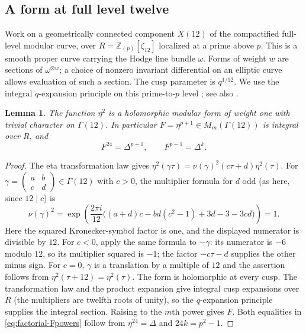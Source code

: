 \documentclass[11pt,a4paper]{article}
\numberwithin{equation}{section}
\newtheorem{lemma}[theorem]{Lemma}
\theoremstyle{definition}
\theoremstyle{remark}
\newcommand{\Z}{\mathbb Z}
\begin{document}
\subsection{A form at full level twelve}
Work on a geometrically connected component $X(12)$ of the compactified
full-level modular curve, over $R=\Z_{(p)}[\zeta_{12}]$ localized at a
prime above $p$. This is a smooth proper curve carrying the Hodge line
bundle $\omega$. Forms of weight $w$ are sections of $\omega^{\otimes w}$;
a choice of nonzero invariant differential on an elliptic curve allows
evaluation of such a section. The cusp parameter is $q^{1/12}$.
We use the integral $q$-expansion principle on this prime-to-$p$ level
\citep[\S1.6]{Katz73}; see also \citealp{DR73}.

\begin{lemma}\label{lem:eta-level12}
The function $\eta^2$ is a holomorphic modular form of weight one with
trivial character on $\Gamma(12)$. In particular
$F=\eta^{p+1}\in M_m(\Gamma(12))$ is integral over $R$, and
\begin{equation}\label{eq:factorial-Fpowers}
F^{24}=\Delta^{p+1},\qquad F^{p-1}=\Delta^k.
\end{equation}
\end{lemma}
\begin{proof}
The eta transformation law \citep[Ch.~4]{Knopp70} gives
$\eta^2(\gamma\tau)=\nu(\gamma)^2(c\tau+d)\eta^2(\tau)$.
For $\gamma=\begin{pmatrix}a&b\\c&d\end{pmatrix}\in\Gamma(12)$ with
$c>0$, the multiplier formula for $d$ odd (as here, since $12\mid c$) is
\[
\nu(\gamma)^2=
\exp\!\left(\frac{2\pi i}{12}
\bigl((a+d)c-bd(c^2-1)+3d-3-3cd\bigr)\right)=1.
\]
Here the squared Kronecker-symbol factor is one, and the displayed
numerator is divisible by $12$. For $c<0$, apply the same formula to
$-\gamma$: its numerator is $-6$ modulo $12$, so its multiplier squared
is $-1$; the factor $-c\tau-d$ supplies the other minus sign.
For $c=0$, $\gamma$ is a translation by a multiple of $12$ and the
assertion follows from $\eta^2(\tau+12)=\eta^2(\tau)$.
The form is holomorphic at every cusp. The transformation law and the
product expansion give integral cusp expansions over $R$ (the multipliers
are twelfth roots of unity), so the $q$-expansion principle supplies the
integral section. Raising to the $m$th power gives $F$.
Both equalities in \eqref{eq:factorial-Fpowers} follow from
$\eta^{24}=\Delta$ and $24k=p^2-1$.
\end{proof}
\end{document}
